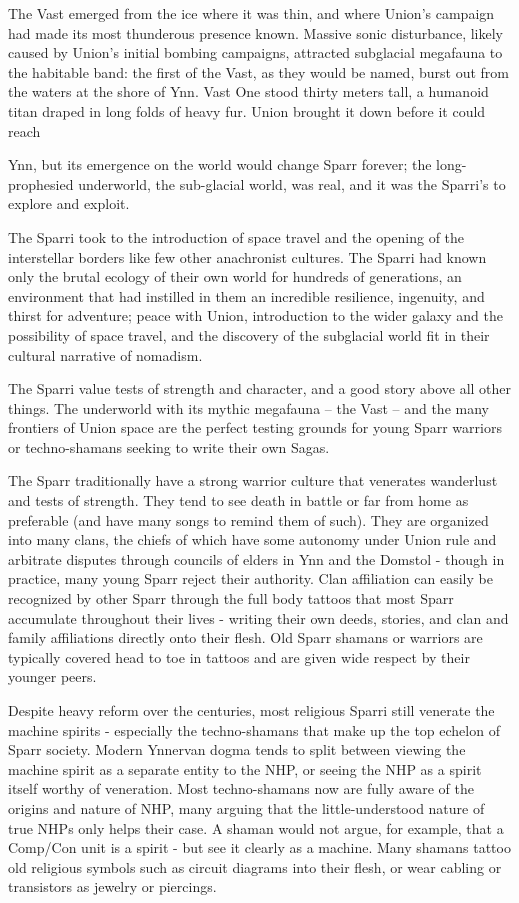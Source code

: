 The Vast emerged from the ice where it was thin, and where Union’s campaign had made its most
thunderous presence known. Massive sonic disturbance, likely caused by Union’s initial bombing
campaigns, attracted subglacial megafauna to the habitable band: the first of the Vast, as they
would be named, burst out from the waters at the shore of Ynn. Vast One stood thirty meters tall,
a humanoid titan draped in long folds of heavy fur. Union brought it down before it could reach

Ynn, but its emergence on the world would change Sparr forever; the long-prophesied
underworld, the sub-glacial world, was real, and it was the Sparri’s to explore and exploit.

The Sparri took to the introduction of space travel and the opening of the interstellar borders like
few other anachronist cultures. The Sparri had known only the brutal ecology of their own world
for hundreds of generations, an environment that had instilled in them an incredible resilience,
ingenuity, and thirst for adventure; peace with Union, introduction to the wider galaxy and the
possibility of space travel, and the discovery of the subglacial world fit in their cultural narrative of
nomadism.

The Sparri value tests of strength and character, and a good story above all other things. The
underworld with its mythic megafauna -- the Vast -- and the many frontiers of Union space are the
perfect testing grounds for young Sparr warriors or techno-shamans seeking to write their own
Sagas.

The Sparr traditionally have a strong warrior culture that venerates wanderlust and tests of
strength. They tend to see death in battle or far from home as preferable (and have many songs
to remind them of such). They are organized into many clans, the chiefs of which have some
autonomy under Union rule and arbitrate disputes through councils of elders in Ynn and the
Domstol - though in practice, many young Sparr reject their authority. Clan affiliation can easily be
recognized by other Sparr through the full body tattoos that most Sparr accumulate throughout
their lives - writing their own deeds, stories, and clan and family affiliations directly onto their flesh.
Old Sparr shamans or warriors are typically covered head to toe in tattoos and are given wide
respect by their younger peers.

Despite heavy reform over the centuries, most religious Sparri still venerate the machine spirits -
especially the techno-shamans that make up the top echelon of Sparr society. Modern Ynnervan
dogma tends to split between viewing the machine spirit as a separate entity to the NHP, or
seeing the NHP as a spirit itself worthy of veneration. Most techno-shamans now are fully aware
of the origins and nature of NHP, many arguing that the little-understood nature of true NHPs only
helps their case. A shaman would not argue, for example, that a Comp/Con unit is a spirit - but
see it clearly as a machine. Many shamans tattoo old religious symbols such as circuit diagrams
into their flesh, or wear cabling or transistors as jewelry or piercings.

